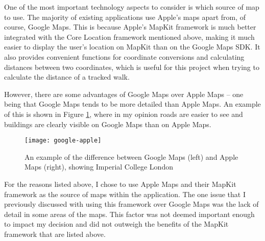 One of the most important technology aspects to consider is which source of map to use. The majority of existing applications use Apple's maps apart from, of course, Google Maps. This is because Apple's MapKit framework \cite{AppleInc.a} is much better integrated with the Core Location framework mentioned above, making it much easier to display the user's location on MapKit than on the Google Maps SDK. It also provides convenient functions for coordinate conversions and calculating distances between two coordinates, which is useful for this project when trying to calculate the distance of a tracked walk.

However, there are some advantages of Google Maps over Apple Maps -- one being that Google Maps tends to be more detailed than Apple Maps. An example of this is shown in Figure \ref{fig:google-apple}, where in my opinion roads are easier to see and buildings are clearly visible on Google Maps than on Apple Maps.

\begin{figure}[hbt]
  \centering
  \texttt{[image: google-apple]}
  \caption{An example of the difference between Google Maps (left) and Apple Maps (right), showing Imperial College London}
  \label{fig:google-apple}
\end{figure}


For the reasons listed above, I chose to use Apple Maps and their MapKit framework as the source of maps within the application. The one issue that I previously discussed with using this framework over Google Maps was the lack of detail in some areas of the maps. This factor was not deemed important enough to impact my decision and did not outweigh the benefits of the MapKit framework that are listed above.













